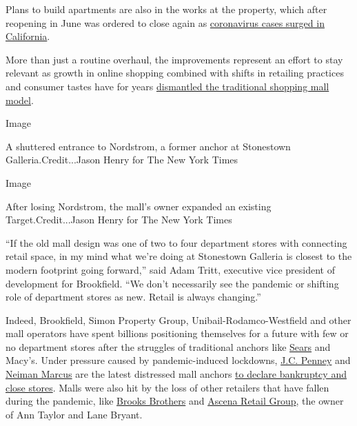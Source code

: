 Plans to build apartments are also in the works at the property, which
after reopening in June was ordered to close again as
\href{https://www.nytimes.com/interactive/2020/us/california-coronavirus-cases.html}{coronavirus
cases surged in California}.

More than just a routine overhaul, the improvements represent an effort
to stay relevant as growth in online shopping combined with shifts in
retailing practices and consumer tastes have for years
\href{https://www.nytimes.com/2020/07/05/business/coronavirus-malls-department-stores-bankruptcy.html}{dismantled
the traditional shopping mall model}.

Image

A shuttered entrance to Nordstrom, a former anchor at Stonestown
Galleria.Credit...Jason Henry for The New York Times

Image

After losing Nordstrom, the mall's owner expanded an existing
Target.Credit...Jason Henry for The New York Times

``If the old mall design was one of two to four department stores with
connecting retail space, in my mind what we're doing at Stonestown
Galleria is closest to the modern footprint going forward,'' said Adam
Tritt, executive vice president of development for Brookfield. ``We
don't necessarily see the pandemic or shifting role of department stores
as new. Retail is always changing.''

Indeed, Brookfield, Simon Property Group, Unibail-Rodamco-Westfield and
other mall operators have spent billions positioning themselves for a
future with few or no department stores after the struggles of
traditional anchors like
\href{https://www.nytimes.com/2018/10/14/business/sears-bankruptcy-filing-chapter-11.html}{Sears}
and Macy's. Under pressure caused by pandemic-induced lockdowns,
\href{https://www.nytimes.com/2020/05/15/business/jc-penney-bankruptcy-coronavirus.html}{J.C.
Penney} and
\href{https://www.nytimes.com/2020/05/07/business/neiman-marcus-bankruptcy.html}{Neiman
Marcus} are the latest distressed mall anchors
\href{https://www.nytimes.com/2020/05/14/business/coronavirus-retail-bankruptcies-private-equity.html}{to
declare bankruptcy and close stores}. Malls were also hit by the loss of
other retailers that have fallen during the pandemic, like
\href{https://www.nytimes.com/2020/07/08/business/brooks-brothers-chapter-11-bankruptcy.html}{Brooks
Brothers} and
\href{https://www.nytimes.com/2020/07/23/business/ascena-bankruptcy-ann-taylor-lane-bryant.html}{Ascena
Retail Group}, the owner of Ann Taylor and Lane Bryant.

